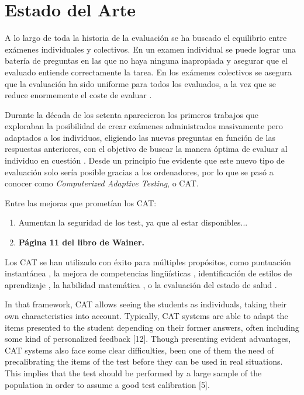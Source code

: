 \chapter{Estado del Arte\label{sec:estado_del_arte}}

A lo largo de toda la historia de la evaluación se ha buscado el equilibrio entre exámenes individuales y colectivos. En un examen individual se puede lograr una batería de preguntas en las que no haya ninguna inapropiada y asegurar que el evaluado entiende correctamente la tarea. En los exámenes colectivos se asegura que la evaluación ha sido uniforme para todos los evaluados, a la vez que se reduce enormemente el coste de evaluar \cite{Wainer00}.

Durante la década de los setenta aparecieron los primeros trabajos que exploraban la posibilidad de crear exámenes administrados masivamente pero adaptados a los individuos, eligiendo las nuevas preguntas en función de las respuestas anteriores, con el objetivo de buscar la manera óptima de evaluar al individuo en cuestión \cite{Lord68}. Desde un principio fue evidente que este nuevo tipo de evaluación solo sería posible gracias a los ordenadores, por lo que se pasó a conocer como \textit{Computerized Adaptive Testing}, o \acrshort{CAT}.

Entre las mejoras que prometían los \acrshort{CAT}\cite{Green83}:

\begin{enumerate}
	\item Aumentan la seguridad de los test, ya que al estar disponibles...
	\item \textbf{Página 11 del libro de Wainer.}
\end{enumerate}

Los \acrshort{CAT} se han utilizado con éxito para múltiples propósitos, como puntuación instantánea \cite{Wainer00}, la mejora de competencias lingüísticas \cite{Chapelle06} , identificación de estilos de aprendizaje \cite{Ortigosa10}, la habilidad matemática \cite{Klinkenberg11}, o la evaluación del estado de salud \cite{Revicki97}.


In that framework, CAT allows seeing the
students as individuals, taking their own characteristics into
account. Typically, CAT systems are able to adapt the items
presented to the student depending on their former answers, often
including some kind of personalized feedback [12].
Though presenting evident advantages, CAT systems also face
some clear difficulties, been one of them the need of precalibrating
the items of the test before they can be used in real
situations. This implies that the test should be performed by a
large sample of the population in order to assume a good test
calibration [5].


